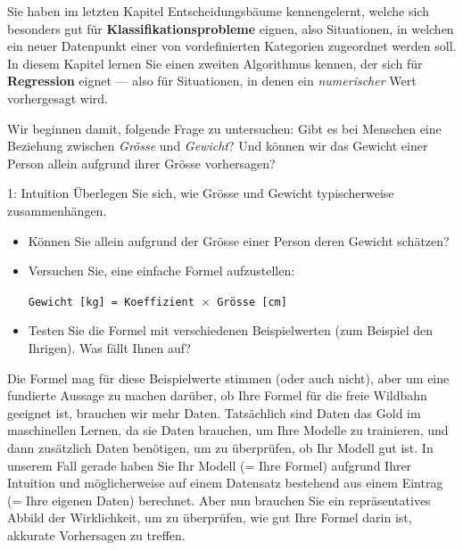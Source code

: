 \begin{lpu}
\label{sec:regression}

Sie haben im letzten Kapitel Entscheidungsbäume kennengelernt, welche sich besonders gut für \textbf{Klassifikationsprobleme} eignen, also Situationen, in welchen ein neuer Datenpunkt einer von vordefinierten Kategorien zugeordnet werden soll. In diesem Kapitel lernen Sie einen zweiten Algorithmus kennen, der sich für \textbf{Regression} eignet — also für Situationen, in denen ein \textit{numerischer} Wert vorhergesagt wird.

Wir beginnen damit, folgende Frage zu untersuchen: Gibt es bei Menschen eine Beziehung zwischen \emph{Grösse} und \emph{Gewicht}? Und können wir das Gewicht einer Person allein aufgrund ihrer Grösse vorhersagen?

\begin{aufgabe}{1: Intuition}
Überlegen Sie sich, wie Grösse und Gewicht typischerweise zusammenhängen.

\begin{itemize}
  \item Können Sie allein aufgrund der Grösse einer Person deren Gewicht schätzen?
  \item Versuchen Sie, eine einfache Formel aufzustellen:
  
  \medskip
  \texttt{Gewicht [kg] = Koeffizient $\times$ Grösse [cm]}
  
  \item Testen Sie die Formel mit verschiedenen Beispielwerten (zum Beispiel den Ihrigen). Was fällt Ihnen auf?
\end{itemize}
\end{aufgabe}

Die Formel mag für diese Beispielwerte stimmen (oder auch nicht), aber um eine fundierte Aussage zu machen darüber, ob Ihre Formel für die freie Wildbahn geeignet ist, brauchen wir mehr Daten. Tatsächlich sind Daten das Gold im maschinellen Lernen, da sie Daten brauchen, um Ihre Modelle zu trainieren, und dann zusätzlich Daten benötigen, um zu überprüfen, ob Ihr Modell gut ist. In unserem Fall gerade haben Sie Ihr Modell (= Ihre Formel) aufgrund Ihrer Intuition und möglicherweise auf einem Datensatz bestehend aus einem Eintrag (= Ihre eigenen Daten) berechnet. Aber nun brauchen Sie ein repräsentatives Abbild der Wirklichkeit, um zu überprüfen, wie gut Ihre Formel darin ist, akkurate Vorhersagen zu treffen.


\end{lpu}
